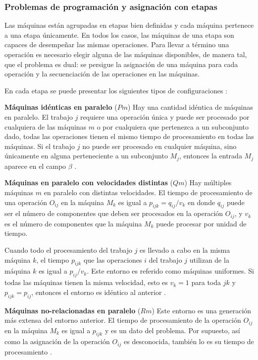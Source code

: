 \documentclass[spanish,draft,12pt,headsepline,footsepline,paper=letter]{scrreprt}
\begin{document}
\subsubsection{Problemas de programación y asignación con etapas}

Las máquinas están agrupadas en etapas bien definidas y cada máquina pertenece a una etapa únicamente. En todos los casos, las máquinas de una etapa son capaces de desempeñar las mismas operaciones. Para llevar a término una operación es necesario elegir alguna de las máquinas disponibles, de manera tal, que el problema es dual: se persigue la asignación de una máquina para cada operación y la secuenciación de las operaciones en las máquinas.

En cada etapa se puede presentar los siguientes tipos de configuraciones \citep[p.~8]{TKindt2002}:

\textbf{Máquinas idénticas en paralelo} ($Pm$) Hay una cantidad idéntica de máquinas en paralelo. El trabajo $j$ requiere una operación única y puede ser procesado por cualquiera de las máquinas $m$ o por cualquiera que pertenezca a un subconjunto dado, todas las operaciones tienen el mismo tiempo de procesamiento en todas las máquinas. Si el trabajo $j$ no puede ser procesado en cualquier máquina, sino únicamente en alguna perteneciente a un subconjunto $M_j$, entonces la entrada $M_j$ aparece en el campo $\beta$ \citep[p.~14, p.~8]{Pinedo1995,TKindt2002}.

\textbf{Máquinas en paralelo con velocidades distintas} ($Qm$) Hay múltiples máquinas $m$ en paralelo con distintas velocidades.
El tiempo de procesamiento de una operación $O_{ij}$ en la máquina $M_k$ es igual a $p_{ijk} = q_{ij}/v_k$ en donde $q_{ij}$ puede ser el número de componentes que deben ser procesados en la operación $O_{ij}$, y $v_k$ es el número de componentes que la máquina $M_k$ puede procesar por unidad de tiempo.

Cuando todo el procesamiento del trabajo $j$ es llevado a cabo en la misma máquina $k$, el tiempo $p_{ijk}$ que las operaciones $i$ del trabajo $j$ utilizan de la máquina $k$ es igual a $p_{ij}/v_k$. Este entorno es referido como máquinas uniformes. Si todas las máquinas tienen la misma velocidad, esto es $v_k = 1$ para toda $jk$ y $p_{ijk} = p_{ij}$, entonces el entorno es idéntico al anterior \citep[p.~14, p.~8]{Pinedo1995,TKindt2002}.

\textbf{Máquinas no-relacionadas en paralelo} ($Rm$) Este entorno es una generación más extensa del entorno anterior. El tiempo de procesamiento de la operación $O_{ij}$ en la máquina $M_k$ es igual a $p_{ijk}$ y es un dato del problema. Por supuesto, así como la asignación de la operación $O_{ij}$ es desconocida, también lo es su tiempo de procesamiento \citep[p.~14, p.~9]{Pinedo1995,TKindt2002}.
\end{document}
